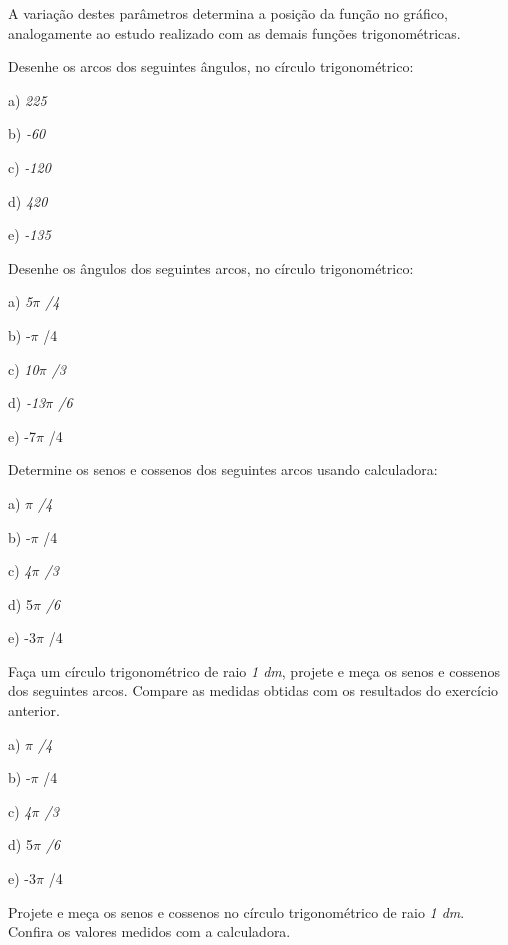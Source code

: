 A variação destes parâmetros determina a posição da função no gráfico, analogamente ao estudo realizado com as demais funções trigonométricas.

\begin{exercicios}
\item Desenhe os arcos dos seguintes ângulos, no círculo trigonométrico:

a) \textit{225\degree}

b) \textit{-60\degree }

c) \textit{-120\degree}

d) \textit{420\degree}

e) \textit{-135\degree}

\item Desenhe os ângulos dos seguintes arcos, no círculo trigonométrico:

a) \textit{5$ \pi $ /4}

b) -$ \pi $ /4

c) \textit{10$ \pi $ /3}

d) \textit{-13$ \pi $ /6}

e) -7$ \pi $ /4

\item Determine os senos e cossenos dos seguintes arcos usando calculadora:

a) \textit{ $ \pi $ /4}

b) -$ \pi $ /4

c) \textit{4$ \pi $ /3}

d) 5\textit{$ \pi $ /6\tab }

e) -3$ \pi $ /4

\item Faça um círculo trigonométrico de raio \textit{1 dm}, projete e meça os senos e cossenos dos seguintes arcos. Compare as medidas obtidas com os resultados do exercício anterior.

a) \textit{$ \pi $ /4}

b) -$ \pi $ /4

c) \textit{4$ \pi $ /3}

d) 5\textit{$ \pi $ /6}

e) -3$ \pi $ /4

\item Projete e meça os senos e cossenos no círculo trigonométrico de raio \textit{1 dm}. Confira os valores medidos com a calculadora.


\end{exercicios}
